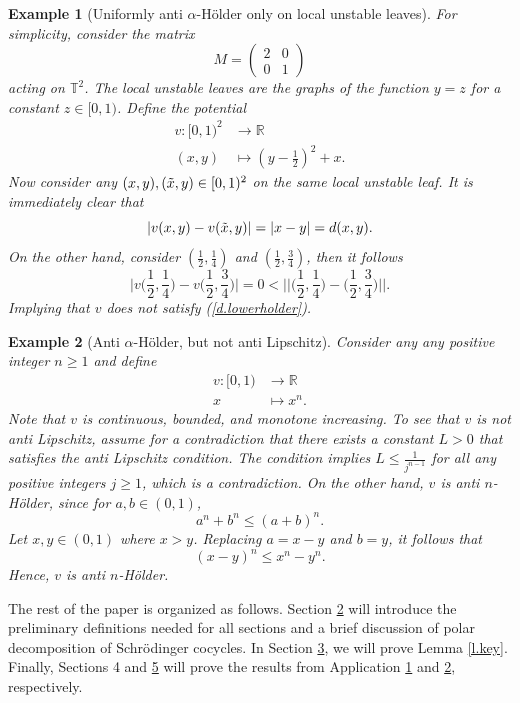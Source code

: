 \documentclass{amsart}
\newtheorem{example}{Example}
\newcommand{\RR}{\mathbb{R}}
\newcommand{\TT}{\mathbb{T}}
\begin{document}
\begin{example}[Uniformly anti $\alpha$-H\"older only on local unstable leaves]\label{ex.3}
    For simplicity, consider the matrix 
    \[M = \begin{pmatrix}
        2 & 0\\
        0 & 1
    \end{pmatrix}\]
    acting on $\TT^2$. The local unstable leaves are the graphs of the function $y = z$ for a constant $z\in [0,1)$. Define the potential
    \begin{align*}
        v:[0,1)^2 &\rightarrow \RR\\
        (x,y) &\mapsto (y-\frac{1}{2})^2 + x.
    \end{align*}
    Now consider any $(x, y), (\Tilde{x},y)\in [0,1)^2$ on the same local unstable leaf. It is immediately clear that
    \[|v(x,y) - v(\Tilde{x},y)| = |x - y| = d(x,y).\]
    On the other hand, consider $(\frac{1}{2}, \frac{1}{4})$ and $(\frac{1}{2}, \frac{3}{4})$, then it follows
    \[\Bigg|v\Big(\frac{1}{2}, \frac{1}{4}\Big) - v\Big(\frac{1}{2}, \frac{3}{4}\Big)\Bigg| = 0 < \Bigg|\Bigg|\Big(\frac{1}{2}, \frac{1}{4}\Big) - \Big(\frac{1}{2}, \frac{3}{4}\Big)\Bigg|\Bigg|.\]
    Implying that $v$ does not satisfy (\ref{d.lowerholder}).
\end{example}

\begin{example}[Anti $\alpha$-H\"older, but not anti Lipschitz] \label{ex.monomial}
    Consider any any positive integer $n\geq 1$ and define
    \begin{align*}
        v: [0,1) &\rightarrow \RR\\
        x &\mapsto x^n.
    \end{align*}
    Note that $v$ is continuous, bounded, and monotone increasing. To see that $v$ is not anti Lipschitz, assume for a contradiction that there exists a constant $L>0$ that satisfies the anti Lipschitz condition. The condition implies $L\leq \frac{1}{j^{n-1}}$ for all any positive integers $j\geq 1$, which is a contradiction. On the other hand, $v$ is anti $n$-H\"older, since for $a,b\in (0,1)$,
    \[a^n + b^n \leq (a+b)^n.\]
    Let $x,y\in (0,1)$ where $x>y$. Replacing $a = x-y$ and $b=y$, it follows that
    \[(x-y)^n \leq x^n - y^n.\]
    Hence, $v$ is anti $n$-H\"older.
\end{example}

The rest of the paper is organized as follows. Section \hyperlink{secprelim}{2} will introduce the preliminary definitions needed for all sections and a brief discussion of polar decomposition of Schr\"odinger cocycles. In Section \hyperlink{pfkey}{3}, we will prove Lemma \ref{l.key}. Finally, Sections \hypertarget{SFT}{4} and \hyperlink{OEDT}{5} will prove the results from Application \hyperlink{Application1}{1} and \hyperlink{Application2}{2}, respectively.
\end{document}
